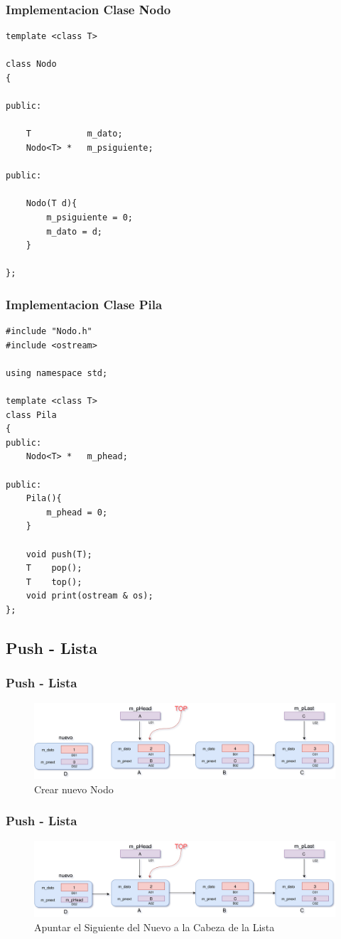 \documentclass{beamer}
\begin{document}
\begin{frame}[fragile]
\frametitle{Implementacion Clase Nodo}
\begin{verbatim}
template <class T>

class Nodo
{

public:

	T           m_dato;
	Nodo<T> *   m_psiguiente;	

public:

	Nodo(T d){
		m_psiguiente = 0;
		m_dato = d;
	}

};
\end{verbatim}
\end{frame}  


\begin{frame}[fragile]
\frametitle{Implementacion Clase Pila}
\begin{verbatim}
#include "Nodo.h"
#include <ostream>

using namespace std;

template <class T>
class Pila
{
public:
	Nodo<T> *   m_phead;
	
public:
	Pila(){
		m_phead = 0;
	}

	void push(T);
	T    pop();
	T    top();
	void print(ostream & os);	
};
\end{verbatim}
\end{frame}  

\subsection{Push - Lista}
\begin{frame}
    \frametitle{Push - Lista}
    
    \begin{figure}
    \includegraphics[width =1 \textwidth]{images/push01}
    \caption{Crear nuevo Nodo}
    \end{figure}
       
\end{frame}

\begin{frame}
    \frametitle{Push - Lista}
    
    \begin{figure}
    \includegraphics[width =1 \textwidth]{images/push02}
    \caption{Apuntar el Siguiente del Nuevo a la Cabeza de la Lista}
    \end{figure}
       
\end{frame}
\end{document}
